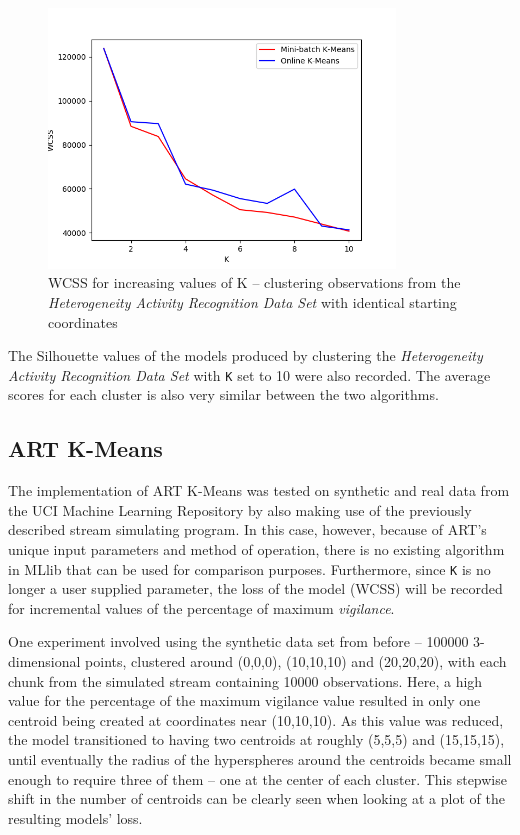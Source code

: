 \documentclass{l4proj}
\begin{document}
\begin{figure}[H]
	\centering
    \label{fig:res11}
    \includegraphics[width=0.82\textwidth]{images/result11}
    \caption{WCSS for increasing values of K -- clustering observations from the \textit{Heterogeneity Activity Recognition Data Set} with identical starting coordinates} 
\end{figure}


The Silhouette values of the models produced by clustering the \textit{Heterogeneity Activity Recognition Data Set} with \texttt{K} set to 10 were also recorded. The average scores for each cluster is also very similar between the two algorithms.

\subsection{ART K-Means}

The implementation of ART K-Means was tested on synthetic and real data from the UCI Machine Learning Repository by also making use of the previously described stream simulating program. In this case, however, because of ART's unique input parameters and method of operation, there is no existing algorithm in MLlib that can be used for comparison purposes. Furthermore, since \texttt{K} is no longer a user supplied parameter, the loss of the model (WCSS) will be recorded for incremental values of the percentage of maximum \textit{vigilance}.

One experiment involved using the synthetic data set from before -- 100000 3-dimensional points, clustered around (0,0,0), (10,10,10) and (20,20,20), with each chunk from the simulated stream containing 10000 observations. Here, a high value for the percentage of the maximum vigilance value resulted in only one centroid being created at coordinates near (10,10,10). As this value was reduced, the model transitioned to having two centroids at roughly (5,5,5) and (15,15,15), until eventually the radius of the hyperspheres around the centroids became small enough to require three of them -- one at the center of each cluster. This stepwise shift in the number of centroids can be clearly seen when looking at a plot of the resulting models' loss.
\end{document}
